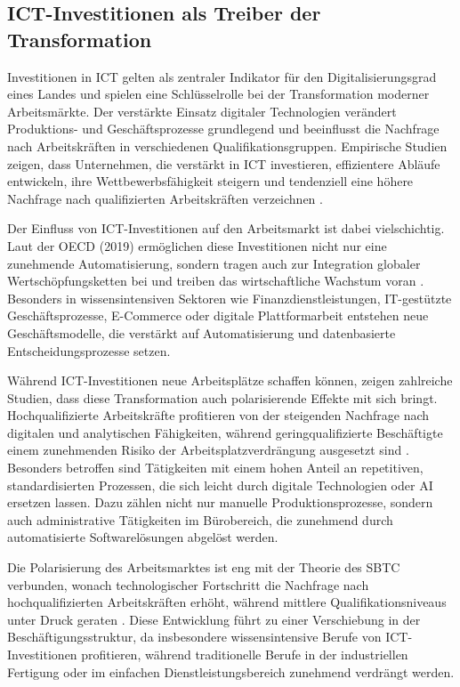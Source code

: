 \subsection{ICT-Investitionen als Treiber der Transformation}

Investitionen in \ac{ICT} gelten als zentraler Indikator für den Digitalisierungsgrad eines 
Landes und spielen eine Schlüsselrolle bei der Transformation moderner Arbeitsmärkte. Der 
verstärkte Einsatz digitaler Technologien verändert Produktions- und Geschäftsprozesse 
grundlegend und beeinflusst die Nachfrage nach Arbeitskräften in verschiedenen 
Qualifikationsgruppen. Empirische Studien zeigen, dass Unternehmen, die verstärkt in 
\ac{ICT} investieren, effizientere Abläufe entwickeln, ihre Wettbewerbsfähigkeit steigern 
und tendenziell eine höhere Nachfrage nach qualifizierten Arbeitskräften verzeichnen 
\parencite[vgl.][S. 12]{corrado2018intangible}.

Der Einfluss von \ac{ICT}-Investitionen auf den Arbeitsmarkt ist dabei vielschichtig. Laut 
der \ac{OECD} (2019) ermöglichen diese Investitionen nicht nur eine zunehmende Automatisierung, 
sondern tragen auch zur Integration globaler Wertschöpfungsketten bei und treiben das 
wirtschaftliche Wachstum voran \parencite[vgl.][S. 15ff]{oecd2019measuring}. Besonders in 
wissensintensiven Sektoren wie Finanzdienstleistungen, IT-gestützte Geschäftsprozesse, 
E-Commerce oder digitale Plattformarbeit entstehen neue Geschäftsmodelle, die verstärkt 
auf Automatisierung und datenbasierte Entscheidungsprozesse setzen.

Während \ac{ICT}-Investitionen neue Arbeitsplätze schaffen können, zeigen zahlreiche 
Studien, dass diese Transformation auch polarisierende Effekte mit sich bringt. 
Hochqualifizierte Arbeitskräfte profitieren von der steigenden Nachfrage nach digitalen 
und analytischen Fähigkeiten, während geringqualifizierte Beschäftigte einem zunehmenden 
Risiko der Arbeitsplatzverdrängung ausgesetzt sind 
\parencite[vgl.][Kap. 2]{brynjolfsson2014thesecond}. Besonders betroffen sind Tätigkeiten 
mit einem hohen Anteil an repetitiven, standardisierten Prozessen, die sich leicht durch 
digitale Technologien oder \ac{AI} ersetzen lassen. Dazu zählen nicht nur 
manuelle Produktionsprozesse, sondern auch administrative Tätigkeiten im Bürobereich, die 
zunehmend durch automatisierte Softwarelösungen abgelöst werden.

Die Polarisierung des Arbeitsmarktes ist eng mit der Theorie des \ac{SBTC} verbunden, 
wonach technologischer Fortschritt die Nachfrage nach hochqualifizierten Arbeitskräften 
erhöht, während mittlere Qualifikationsniveaus unter Druck geraten 
\parencite[vgl.][S. 22]{acemoglu2002technical}. Diese Entwicklung führt zu einer Verschiebung 
in der Beschäftigungsstruktur, da insbesondere wissensintensive Berufe von 
\ac{ICT}-Investitionen profitieren, während traditionelle Berufe in der industriellen 
Fertigung oder im einfachen Dienstleistungsbereich zunehmend verdrängt werden.


